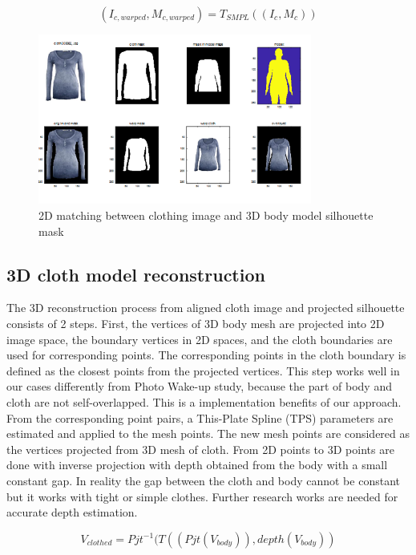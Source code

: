 \begin{equation}
(I_{c, warped}, M_{c, warped})  = T_{SMPL} ((I_c, M_c))
\end{equation}


\begin{figure}
\centering
\includegraphics[width=9cm]{figures/2dmatching.png}   %
\caption{2D matching between clothing image and 3D body model silhouette mask}
\label{fig:2DmatchingOfClothAndBody}
\end{figure}


\subsection{3D cloth model reconstruction }


The 3D reconstruction process from aligned cloth image and projected silhouette consists of 2 steps. First, the vertices of 3D body mesh are projected into 2D image space, the boundary vertices in 2D spaces, and the cloth boundaries are used for corresponding points. The corresponding points in the cloth boundary is defined as the closest points from the projected vertices. This step works well in our cases differently from Photo Wake-up\cite{Weng2018PhotoW3} study, because the part of body and cloth are not self-overlapped. This is a implementation benefits of our approach. From the corresponding point pairs, a This-Plate Spline (TPS)\cite{Bookstein1989PrincipalWT} parameters are estimated and applied to the mesh points. The new mesh points are considered as the vertices projected from 3D mesh of cloth. From 2D points to 3D points are done with inverse projection with depth obtained from the body with a small constant gap. In reality the gap between the cloth and body cannot be constant but it works with tight or simple clothes. Further research works are needed for accurate depth estimation.   


\begin{equation}
V_{clothed} = Pjt^{-1} ( T( (Pjt(V_{body})), depth(V_{body}) )
\end{equation}


